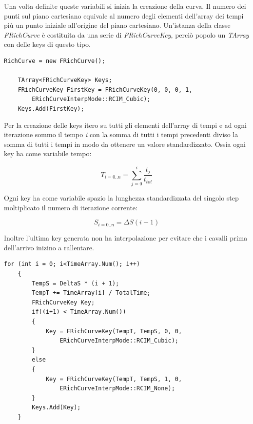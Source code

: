         Una volta definite queste variabili si inizia la creazione della curva.
        Il numero dei punti sul piano cartesiano equivale al numero degli elementi dell'array dei tempi più un punto iniziale all'origine del piano cartesiano.
        Un'istanza della classe \textit{FRichCurve} è costituita da una serie di \textit{FRichCurveKey}, perciò popolo un \textit{TArray} con delle keys di questo tipo.

        \begin{lstlisting}[firstnumber=15]
    RichCurve = new FRichCurve();

    TArray<FRichCurveKey> Keys;
    FRichCurveKey FirstKey = FRichCurveKey(0, 0, 0, 1, 
        ERichCurveInterpMode::RCIM_Cubic);
    Keys.Add(FirstKey);
        \end{lstlisting}

        Per la creazione delle keys itero su tutti gli elementi dell'array di tempi e ad ogni iterazione sommo il tempo \textit{i} con la somma di tutti i tempi precedenti diviso la somma di tutti i tempi in modo da ottenere un valore standardizzato.
        Ossia ogni key ha come variabile tempo:

        \begin{equation}
            T_{i = 0..n} = \sum^{i}_{j = 0} \frac{t_j}{t_{tot}}
        \end{equation}

        Ogni key ha come variabile spazio la lunghezza standardizzata del singolo step moltiplicato il numero di iterazione corrente:

        \begin{equation}
            S_{i = 0..n} =  \Delta S (i+1)
        \end{equation}

        Inoltre l'ultima key generata non ha interpolazione per evitare che i cavalli prima dell'arrivo inizino a rallentare.

        \begin{lstlisting}[firstnumber=22]
    for (int i = 0; i<TimeArray.Num(); i++)
    {
        TempS = DeltaS * (i + 1);							
        TempT += TimeArray[i] / TotalTime;
        FRichCurveKey Key;
        if((i+1) < TimeArray.Num())
        {
            Key = FRichCurveKey(TempT, TempS, 0, 0,
                ERichCurveInterpMode::RCIM_Cubic);
        }
        else
        {
            Key = FRichCurveKey(TempT, TempS, 1, 0, 
                ERichCurveInterpMode::RCIM_None);
        }
        Keys.Add(Key);
    }
        \end{lstlisting}

